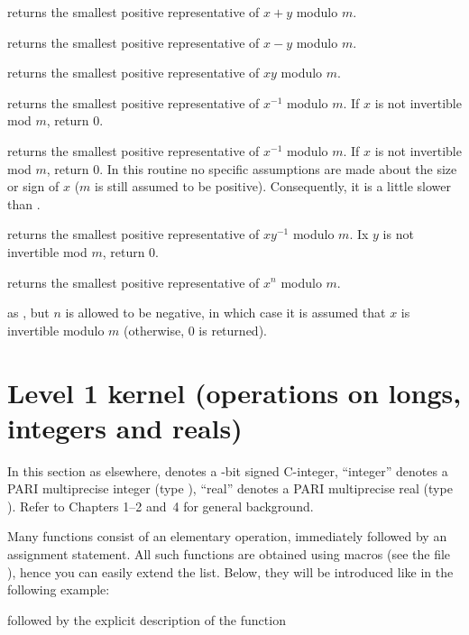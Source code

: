  returns the smallest
positive representative of $x + y$ modulo $m$.

 returns the smallest
positive representative of $x - y$ modulo $m$.

 returns the smallest positive
representative of $x y$ modulo $m$.

 returns the smallest
positive representative of $x^{-1}$ modulo $m$. If $x$ is not invertible
mod $m$, return $0$.

 returns the smallest
positive representative of $x^{-1}$ modulo $m$. If $x$ is not invertible
mod $m$, return $0$. In this routine no specific assumptions are made about
the size or sign of $x$ ($m$ is still assumed to be positive). Consequently,
it is a little slower than .

 returns the smallest
positive representative of $x y^{-1}$ modulo $m$. Ix $y$ is not invertible 
mod $m$, return $0$.

 returns the smallest
positive representative of $x^n$ modulo $m$.

 as , but $n$
is allowed to be negative, in which case it is assumed that $x$ is invertible
modulo $m$ (otherwise, $0$ is returned).

\section{Level 1 kernel (operations on longs, integers and reals)}

\noindent
In this section as elsewhere,  denotes a \B-bit signed C-integer,
``integer'' denotes a PARI multiprecise integer (type ), ``real''
denotes a PARI multiprecise real (type ). Refer to Chapters
1--2 and~4 for general background.

 Many functions consist of an elementary operation,
immediately followed by an assignment statement. All such functions are
obtained using macros (see the file ), hence you can easily
extend the list. Below, they will be introduced like in the following
example:

 followed by the explicit
description of the function

